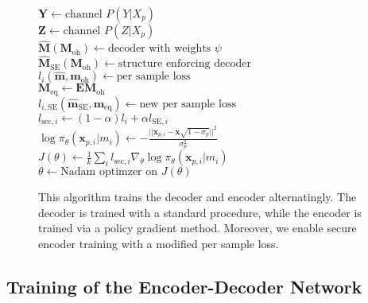 \documentclass[conference, 10pt]{IEEEtran}
\begin{document}
\begin{figure}
{\begin{algorithm}[H]
{        $\mathbf{Y} \leftarrow \text{channel }  P(Y|X_p)$ \\
        $\mathbf{Z} \leftarrow \text{channel }  P(Z|X_p)$ \\
        $\hat{\mathbf{M}}(\mathbf{M}_{\text{oh}}) \leftarrow \text{decoder with weights }\psi$ \\
        $\hat{\mathbf{M}}_{\text{SE}}(\mathbf{M}_{\text{oh}}) \leftarrow \text{structure enforcing decoder}$ \\
        $l_i(\hat{\mathbf{m}},\mathbf{m}_{\text{oh}}) \leftarrow \text{per sample loss}$ \\
        $\mathbf{M}_{\text{eq}}\leftarrow \mathbf{E}\mathbf{M}_{\text{oh}} $\\
        $l_{i,\text{SE}}(\hat{\mathbf{m}}_{\text{SE}},\mathbf{m}_{\text{eq}}) \leftarrow \text{new per sample loss}$ \\
        $l_{\text{sec},i} \leftarrow (1-\alpha)l_i+\alpha l_{\text{SE},i}$ \\
        $\log \pi_{\theta}(\mathbf{x}_{p,i}|m_i) \leftarrow -\frac{||\mathbf{x}_{p,i} - \mathbf{x}\sqrt{1-\sigma_p}||^2}{\sigma_p^2}$ \\
        $J(\theta) \leftarrow \tfrac{1}{k}\sum_i l_{\text{sec},i}\nabla_{\theta}\log \pi_{\theta}(\mathbf{x}_{p,i}|m_i)$ \\
        $\theta \leftarrow \text{Nadam optimzer on } J(\theta)$
        
    \Indm   
        
   
    
    }
    \caption{This algorithm trains the decoder and encoder alternatingly. The decoder is trained with a standard procedure, while the encoder is trained via a policy gradient method. Moreover, we enable secure encoder training with a modified per sample loss.}
    \label{algo:label_alternate_sec_train}
\end{algorithm}
}
\end{figure}

\subsection{Training of the Encoder-Decoder Network}
\end{document}
